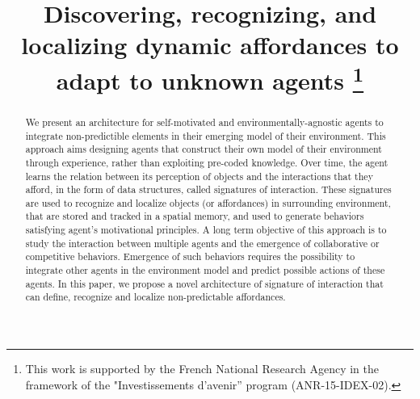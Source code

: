 \documentclass[conference]{IEEEtran}
\begin{document}
\title{
Discovering, recognizing, and localizing dynamic affordances to adapt to unknown agents
\thanks{This work is supported by the French National Research Agency in the framework of the "Investissements d’avenir” program (ANR-15-IDEX-02).}
}

\author{
\and
{}
\and
{}
}

\maketitle

\begin{abstract}
We present an architecture for self-motivated and environmentally-agnostic agents to integrate non-predictible elements in their emerging model of their environment. This approach aims designing agents that construct their own model of their environment through experience, rather than exploiting pre-coded knowledge. Over time, the agent learns the relation between its perception of objects and the interactions that they afford, in the form of data structures, called signatures of interaction. These signatures are used to recognize and localize objects (or affordances) in surrounding environment, that are stored and tracked in a spatial memory, and used to generate behaviors satisfying agent's motivational principles. A long term objective of this approach is to study the interaction between multiple agents and the emergence of collaborative or competitive behaviors. Emergence of such behaviors requires the possibility to integrate other agents in the environment model and predict possible actions of these agents. In this paper, we propose a novel architecture of signature of interaction that can define, recognize and localize non-predictable affordances.
\end{abstract}
\end{document}
